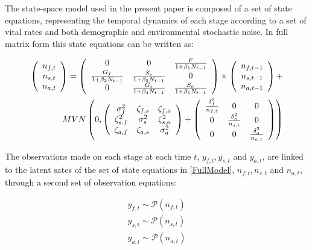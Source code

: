 \documentclass[12pt,a4paper]{article}
\begin{document}
The state-space model used in the present paper is composed of a set of state equations, representing the temporal dynamics of each stage according to a set of vital rates and both demographic and environmental stochastic noise. In full matrix form this state equations can be written as:

\begin{align}\label{FullModel}
	\left(\begin{array}{c}{n_{f, t}} \\ {n_{s, t}} \\ {n_{a, t}}\end{array}\right)=
	\left(\begin{array}{ccc}{0} & {0} & {\frac{F}{1+\beta_{1} N_{t-1}}} \\
		{\frac{G_{f}}{1+\beta_{2} N_{t-1}}} & {\frac{S_{s}}{1+\beta_{3} N_{t-1}}} & {0} \\
		{0} & {\frac{G_{s}}{1+\beta_{4} N_{t-1}}} & {\frac{S_{a}}{1+\beta_{5} N_{t-1}}}\end{array}\right)
	\times\left(\begin{array}{c}{n_{f, t-1}} \\ {n_{s, t-1}} \\ {n_{a, t-1}}\end{array}\right)+ \notag \\
	MVN\left(0,\left(\begin{array}{ccc}{\sigma_{f}^{2}} & {\zeta_{f, s}} & {\zeta_{f, a}} \\
		{\zeta_{s, f}^{2}} & {\sigma_{s}^{2}} & {\zeta_{s, a}^{2}} \\
		{\zeta_{a, f}} & {\zeta_{a, s}} & {\sigma_{a}^{2}}\end{array}\right)+\left(\begin{array}{ccc}{\frac{\delta_{f}^{2}}{n_{f, t}}} & {0} & {0} \\
		{0} & {\frac{\delta_{s}^{2}}{n_{s, t}}} & {0} \\
		{0} & {0} & {\frac{\delta_{a}^{2}}{n_{a, t}}}\end{array}\right)\right)
\end{align}

The observations made on each stage at each time $t$, $y_{f,t}, y_{s,t}$ and $y_{a,t}$, are linked to the latent sates of the set of state equations in \ref{FullModel}, $n_{f,t}, n_{s,t}$ and $n_{a,t}$, through a second set of observation equations:

\begin{equation}\label{ObsEqns}
	\begin{array}
		{l}{y_{f, t} \sim \mathcal{P}(n_{f, t})} \\
		{y_{s, t} \sim \mathcal{P}(n_{s, t})} \\
		{y_{a, t} \sim \mathcal{P}(n_{a, t})}
	\end{array}
\end{equation}
\end{document}
